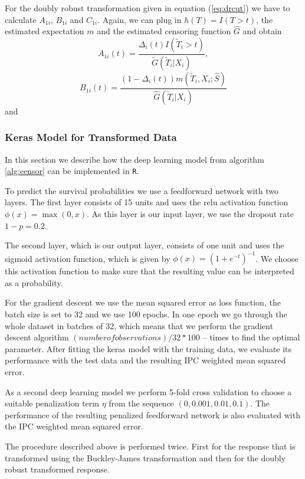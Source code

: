 \documentclass[12pt, a4paper]{article}
\theoremstyle{definition}
\theoremstyle{plain}
\numberwithin{equation}{section}
\numberwithin{figure}{section}
\numberwithin{table}{section}
\begin{document}
	For the doubly robust transformation given in equation (\ref{eq:drcut}) we have to calculate $A_{1i}$, $B_{1i}$ and $C_{1i}$.
	Again, we can plug in $h(T)=I(T>t)$, the estimated expectation $m$ and the estimated censoring function $\hat{G}$ and obtain
	\begin{equation*}
		A_{1i}(t)=\frac{\Delta_i(t)I(\tilde{T}_i >t)}{\tilde{G}(\tilde{T}_i\vert X_i)},
	\end{equation*}
	\begin{equation*}
		B_{1i}(t) = \frac{(1-\Delta_i(t))m(\tilde{T}_i, X_i; \hat{S})}{\hat{G}(\tilde{T}_i \vert X_i)}
	\end{equation*}
	and
	
	\subsubsection{Keras Model for Transformed Data}
	
	In this section we describe how the deep learning model from algorithm \ref{alg:censor} can be implemented in \texttt{R}.
	
	To predict the survival probabilities we use a feedforward network with two layers.
	The first layer consists of 15 units and uses the relu activation function $\phi(x) = \max(0, x)$.
	As this layer is our input layer, we use the dropout rate $1-p=0.2$.
	
	The second layer, which is our output layer, consists of one unit and uses the sigmoid activation function, which is given by $\phi(x)=(1+e^{-t})^{-1}$.
	We choose this activation function to make sure that the resulting value can be interpreted as a probability.
	
	For the gradient descent we use the mean squared error as loss function, the batch size is set to 32 and we use 100 epochs.
	In one epoch we go through the whole dataset in batches of 32, which means that we perform the gradient descent algorithm $(number of observations)/32*100$ -- times to find the optimal parameter.
	After fitting the keras model with the training data, we evaluate its performance with the test data and the resulting IPC weighted mean squared error.
	
	As a second deep learning model we perform 5-fold cross validation to choose a suitable penalization term $\eta$ from the sequence $(0, 0.001, 0.01, 0.1)$.
	The performance of the resulting penalized feedforward network is also evaluated with the IPC weighted mean squared error.
	
	The procedure described above is performed twice.
	First for the response that is transformed using the Buckley-James transformation and then for the doubly robust transformed response.
\end{document}
